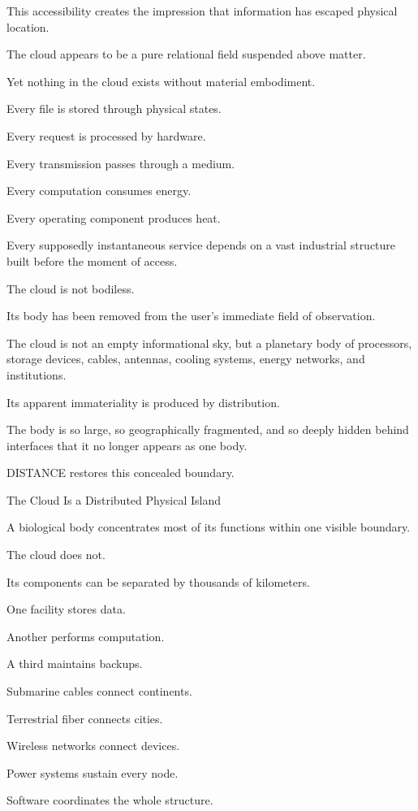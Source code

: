 This accessibility creates the impression that information has escaped physical location.

The cloud appears to be a pure relational field suspended above matter.

Yet nothing in the cloud exists without material embodiment.

Every file is stored through physical states.

Every request is processed by hardware.

Every transmission passes through a medium.

Every computation consumes energy.

Every operating component produces heat.

Every supposedly instantaneous service depends on a vast industrial structure built before the moment of access.

The cloud is not bodiless.

Its body has been removed from the user’s immediate field of observation.

The cloud is not an empty informational sky, but a planetary body of processors, storage devices, cables, antennas, cooling systems, energy networks, and institutions.

Its apparent immateriality is produced by distribution.

The body is so large, so geographically fragmented, and so deeply hidden behind interfaces that it no longer appears as one body.

DISTANCE restores this concealed boundary.

The Cloud Is a Distributed Physical Island

A biological body concentrates most of its functions within one visible boundary.

The cloud does not.

Its components can be separated by thousands of kilometers.

One facility stores data.

Another performs computation.

A third maintains backups.

Submarine cables connect continents.

Terrestrial fiber connects cities.

Wireless networks connect devices.

Power systems sustain every node.

Software coordinates the whole structure.

